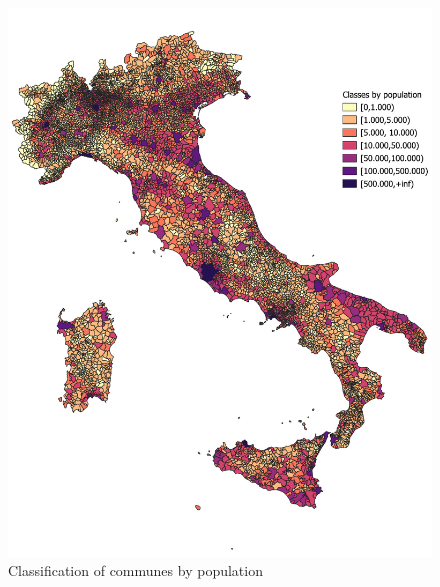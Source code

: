 \begin{figure}[tbp]
	\centering
	\includegraphics[width=\textwidth]{img/comuni_per_classe.pdf}
	\caption{Classification of communes by population}
	\label{map:comm_by_pop_N}
\end{figure}


